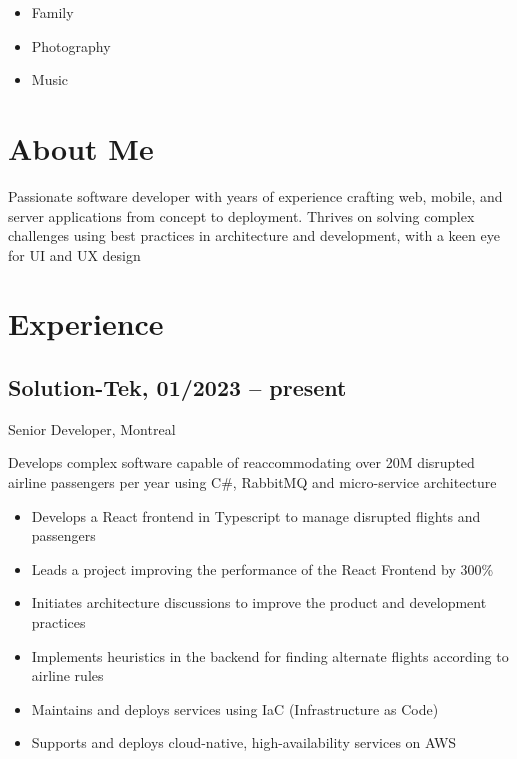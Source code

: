 \documentclass{article}
\begin{document}
\begin{paracol}{2}
\begin{leftcolumn}
    \begin{itemize}
      \item Family
      \item Photography
      \item Music
    \end{itemize}


  \end{leftcolumn}
  \begin{rightcolumn}

    \vspace{-2.5em}
    \section{About Me}

    Passionate software developer with  years of experience
    crafting web, mobile, and server applications from concept to deployment. Thrives
    on solving complex challenges using best practices in architecture and development,
    with a keen eye for UI and UX design

    \section{Experience}

    \subsection{Solution-Tek, 01/2023 -- present}
    {Senior Developer, Montreal\par}
    {
      Develops complex software capable of reaccommodating over 20M disrupted airline passengers per year
      using C\#, RabbitMQ and micro-service architecture
    \par}
    \begin{itemize}
      \item Develops a React frontend in Typescript to manage disrupted flights and passengers
      \item Leads a project improving the performance of the React Frontend by 300\%
      \item Initiates architecture discussions to improve the product and development practices
      \item Implements heuristics in the backend for finding alternate flights according to airline rules
      \item Maintains and deploys services using IaC (Infrastructure as Code)
      \item Supports and deploys cloud-native, high-availability services on AWS
    \end{itemize}


\end{rightcolumn}
\end{paracol}
\end{document}
